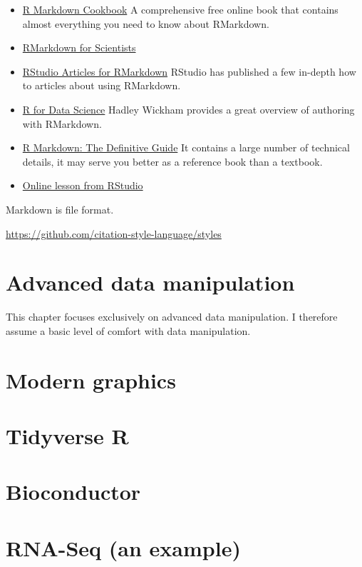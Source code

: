\documentclass[
]{book}
\providecommand{\tightlist}{%
  \setlength{\itemsep}{0pt}\setlength{\parskip}{0pt}}
\begin{document}
\begin{itemize}
\tightlist
\item
  \href{https://bookdown.org/yihui/rmarkdown-cookbook/}{R Markdown Cookbook}
  A comprehensive free online book that contains almost everything you need to know about RMarkdown.
\item
  \href{https://rmd4sci.njtierney.com/}{RMarkdown for Scientists}
\item
  \href{https://support.rstudio.com/hc/en-us/sections/200149716-R-Markdown}{RStudio Articles for RMarkdown}
  RStudio has published a few in-depth how to articles about using RMarkdown.
\item
  \href{https://r4ds.had.co.nz/index.html}{R for Data Science}
  Hadley Wickham provides a great overview of authoring with RMarkdown.
\item
  \href{https://bookdown.org/yihui/rmarkdown/}{R Markdown: The Definitive Guide}
  It contains a large number of technical details, it may serve you better as a reference book than a textbook.
\item
  \href{https://rmarkdown.rstudio.com/lesson-1.html}{Online lesson from RStudio}
\end{itemize}

Markdown is file format.

\url{https://github.com/citation-style-language/styles}

\hypertarget{advanced-data-manipulation}{%
\chapter{Advanced data manipulation}\label{advanced-data-manipulation}}

This chapter focuses exclusively on advanced data manipulation. I therefore assume a basic level of comfort with data manipulation.

\hypertarget{modern-graphics}{%
\chapter{Modern graphics}\label{modern-graphics}}

\hypertarget{tidyverse-r}{%
\chapter{Tidyverse R}\label{tidyverse-r}}

\hypertarget{bioconductor}{%
\chapter{Bioconductor}\label{bioconductor}}

\hypertarget{rna-seq-an-example}{%
\chapter{RNA-Seq (an example)}\label{rna-seq-an-example}}

  
\end{document}
